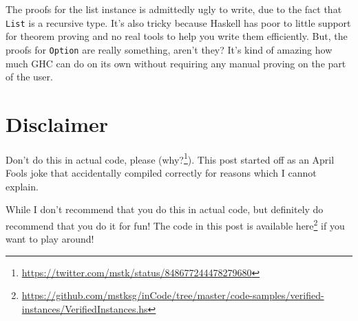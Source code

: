 \documentclass[]{article}
\renewcommand{\href}[2]{#2\footnote{\url{#1}}}
\begin{document}
The proofs for the list instance is admittedly ugly to write, due to the fact
that \texttt{List} is a recursive type. It's also tricky because Haskell has
poor to little support for theorem proving and no real tools to help you write
them efficiently. But, the proofs for \texttt{Option} are really something,
aren't they? It's kind of amazing how much GHC can do on its own without
requiring any manual proving on the part of the user.

\hypertarget{disclaimer}{%
\section{Disclaimer}\label{disclaimer}}

Don't do this in actual code, please
(\href{https://twitter.com/mstk/status/848677244478279680}{why?}). This post
started off as an April Fools joke that accidentally compiled correctly for
reasons which I cannot explain.

While I don't recommend that you do this in actual code, but definitely do
recommend that you do it for fun! The code in this post is available
\href{https://github.com/mstksg/inCode/tree/master/code-samples/verified-instances/VerifiedInstances.hs}{here}
if you want to play around!
\end{document}
